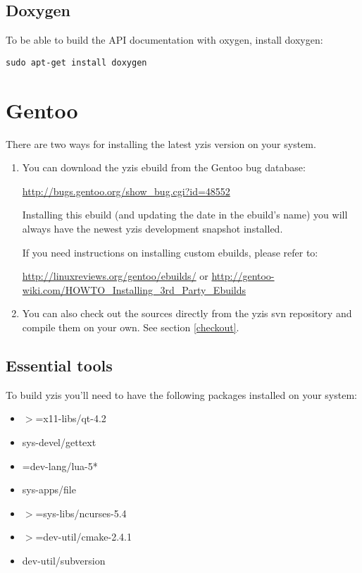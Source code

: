 \documentclass[a4paper,12pt]{report}
\begin{document}
\subsection{Doxygen}
To be able to build the API documentation with oxygen, install doxygen:

\texttt{sudo apt-get install doxygen}

\section{Gentoo}
There are two ways for installing the latest yzis version on your system.

\begin{enumerate}
	\item You can download the yzis ebuild from the Gentoo bug database:

\url{http://bugs.gentoo.org/show\_bug.cgi?id=48552}

Installing this ebuild (and updating the date in the ebuild's name) you will
always have the newest yzis development snapshot installed.

If you need instructions on installing custom ebuilds, please refer to:

\url{http://linuxreviews.org/gentoo/ebuilds/} or
\url{http://gentoo-wiki.com/HOWTO\_Installing\_3rd\_Party\_Ebuilds}

\item You can also check out the sources directly from the yzis svn repository and
compile them on your own. See section \ref{checkout}.
\end{enumerate}

\subsection{Essential tools}
To build yzis you'll need to have the following packages installed on your system:

\begin{itemize}
\item $>$=x11-libs/qt-4.2
\item sys-devel/gettext
\item =dev-lang/lua-5*
\item sys-apps/file         
\item $>$=sys-libs/ncurses-5.4
\item $>$=dev-util/cmake-2.4.1
\item dev-util/subversion
\end{itemize}
\end{document}
